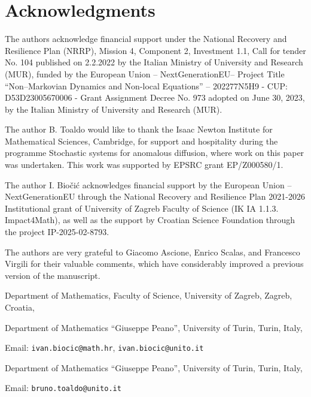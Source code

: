 \documentclass[reqno]{amsart}
\theoremstyle{remark}
\numberwithin{equation}{section} %
\newcommand{\1}{\mathds{1}}
\begin{document}
	\section*{Acknowledgments}
	The authors acknowledge financial support under the National Recovery and Resilience Plan (NRRP), Mission 4, Component 2, Investment 1.1, Call for tender No. 104 published on 2.2.2022 by the Italian Ministry of University and Research (MUR), funded by the European Union – NextGenerationEU– Project Title “Non–Markovian Dynamics and Non-local Equations” – 202277N5H9 - CUP: D53D23005670006 - Grant Assignment Decree No. 973 adopted on June 30, 2023, by the Italian Ministry of University and Research (MUR).
	
	The author B. Toaldo would like to thank the Isaac Newton Institute for Mathematical Sciences, Cambridge, for support and hospitality during the programme Stochastic systems for anomalous diffusion, where work on this paper was undertaken. This work was supported by EPSRC grant EP/Z000580/1.
	
	The author I. Biočić acknowledges financial support by the European Union – NextGenerationEU through the National Recovery and Resilience Plan 2021-2026 Institutional grant of University of Zagreb Faculty of Science (IK IA 1.1.3. Impact4Math), as well as the support by Croatian Science Foundation through the project IP-2025-02-8793.
	
	The authors are very grateful to Giacomo Ascione, Enrico Scalas, and Francesco Virgili for their valuable comments, which have considerably improved a previous version of the manuscript.
	
	
	
	
	
	
	\newpage
	
	
	\noindent Department of Mathematics, Faculty of Science, University of Zagreb, Zagreb, Croatia,
	
	\noindent Department of Mathematics “Giuseppe Peano”, University of Turin, Turin, Italy,
	
	\noindent Email:  \texttt{ivan.biocic@math.hr},
	\texttt{ivan.biocic@unito.it}
	
	\bigskip
	
	
	
	\noindent Department of Mathematics “Giuseppe Peano”, University of Turin, Turin, Italy,
	
	\noindent Email: \texttt{bruno.toaldo@unito.it}
	
	
	
\end{document}

